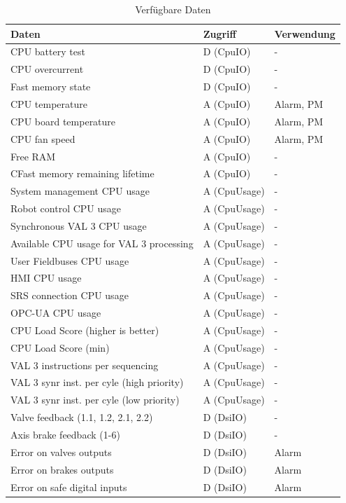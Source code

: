 \documentclass[ a4paper,
                oneside,
                toc=bibliography,
                toc=listof
                ]{scrbook}
\begin{document}
	\begin{longtable}{|p{7cm}|p{3cm}|p{3cm}|}
		\caption{Verfügbare Daten}
		\label{table:Daten}\\
		\hline
		Daten & Zugriff & Verwendung  \\ [0.5ex] 
		\hline
		\endhead
		CPU battery test & D (CpuIO) & -  \\ 
		CPU overcurrent & D (CpuIO) & -  \\
		Fast memory state & D (CpuIO) & - \\
		CPU temperature & A (CpuIO) & Alarm, PM \\
		CPU board temperature & A (CpuIO) & Alarm, PM \\
		CPU fan speed & A (CpuIO) & Alarm, PM \\
		Free RAM & A (CpuIO) & - \\
		CFast memory remaining lifetime & A (CpuIO) & - \\
		\hline
		System management CPU usage & A (CpuUsage) & - \\
		Robot control CPU usage & A (CpuUsage) & - \\			
		Synchronous VAL 3 CPU usage & A (CpuUsage) & - \\
		Available CPU usage for VAL 3 processing& A (CpuUsage) & - \\
		User Fieldbuses CPU usage & A (CpuUsage) & - \\
		HMI CPU usage & A (CpuUsage) & - \\
		SRS connection CPU usage & A (CpuUsage) & - \\
		OPC-UA CPU usage & A (CpuUsage) & - \\
		CPU Load Score (higher is better)& A (CpuUsage) & - \\
		CPU Load Score (min) & A (CpuUsage) & - \\
		VAL 3 instructions per sequencing & A (CpuUsage) & - \\
		VAL 3 synr inst. per cyle (high priority) & A (CpuUsage) & - \\
		VAL 3 synr inst. per cyle (low priority) & A (CpuUsage) & - \\
		\hline
		Valve feedback (1.1, 1.2, 2.1, 2.2) & D (DsiIO) & - \\
		Axis brake feedback (1-6) & D (DsiIO) & - \\
		Error on valves outputs & D (DsiIO) & Alarm \\
		Error on brakes outputs & D (DsiIO) & Alarm \\
		Error on safe digital inputs & D (DsiIO) & Alarm \\

\end{longtable}
\end{document}
